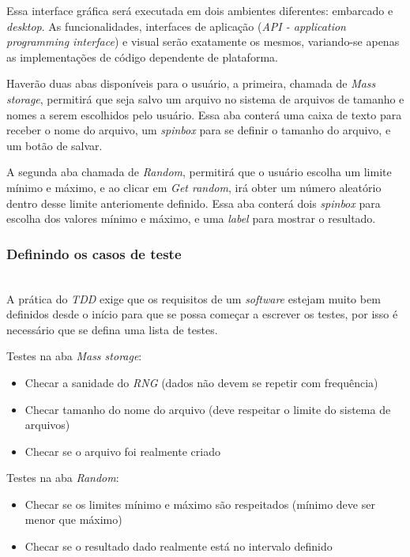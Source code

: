 \documentclass[times, twoside, watermark]{artigo}
\begin{document}
Essa interface gráfica será executada em dois ambientes diferentes: embarcado e 
\textit{desktop}. As funcionalidades, interfaces de aplicação (\textit{API - 
application programming interface}) e visual serão exatamente os mesmos, variando-se
apenas as implementações de código dependente de plataforma. 

Haverão duas abas disponíveis para o usuário, a primeira, chamada de \textit{Mass 
storage}, permitirá que seja salvo um arquivo no sistema de arquivos de 
tamanho e nomes a serem escolhidos pelo usuário. Essa aba conterá uma caixa de texto 
para receber o nome do arquivo, um \textit{spinbox} para se definir o tamanho do 
arquivo, e um botão de salvar.

A segunda aba chamada de \textit{Random}, permitirá que o usuário escolha um limite
mínimo e máximo, e ao clicar em \textit{Get random}, irá obter um número aleatório
dentro desse limite anteriomente definido. Essa aba conterá dois \textit{spinbox}
para escolha dos valores mínimo e máximo, e uma \textit{label} para mostrar o 
resultado.

\subsubsection{Definindo os casos de teste}\hfill\\

A prática do \textit{TDD} exige que os requisitos de um \textit{software}
estejam muito bem definidos desde o início para que se possa começar a escrever 
os testes, por isso é necessário que se defina uma lista de testes.

Testes na aba \textit{Mass storage}:

\begin{itemize}
\item Checar a sanidade do \textit{RNG} (dados não devem se repetir com frequência)
\item Checar tamanho do nome do arquivo (deve respeitar o limite do sistema de arquivos)
\item Checar se o arquivo foi realmente criado
\end{itemize}

Testes na aba \textit{Random}:

\begin{itemize}
\item Checar se os limites mínimo e máximo são respeitados (mínimo deve ser menor que máximo)
\item Checar se o resultado dado realmente está no intervalo definido
\end{itemize}
\end{document}

